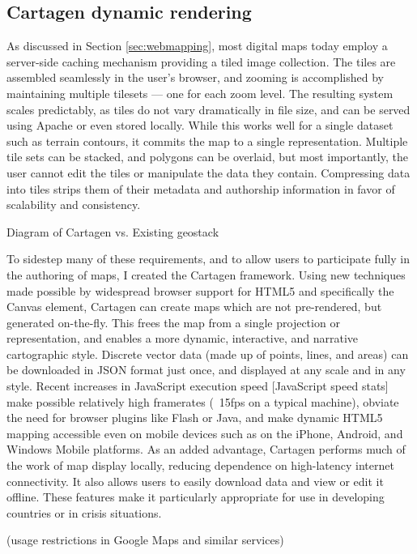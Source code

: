 \documentclass[11pt]{report}
\begin{document}
\subsection{Cartagen dynamic rendering}

As discussed in Section \ref{sec:webmapping}, most digital maps today employ a server-side caching mechanism providing a tiled image collection. The tiles are assembled seamlessly in the user's browser, and zooming is accomplished by maintaining multiple tilesets --- one for each zoom level. The resulting system scales predictably, as tiles do not vary dramatically in file size, and can be served using Apache or even stored locally. While this works well for a single dataset such as terrain contours, it commits the map to a single representation. Multiple tile sets can be stacked, and polygons can be overlaid, but most importantly, the user cannot edit the tiles or manipulate the data they contain. Compressing data into tiles strips them of their metadata and authorship information in favor of scalability and consistency. 

Diagram of Cartagen vs. Existing geostack

To sidestep many of these requirements, and to allow users to participate fully in the authoring of maps, I created the Cartagen framework. Using new techniques made possible by widespread browser support for HTML5 and specifically the Canvas element, Cartagen can create maps which are not pre-rendered, but generated on-the-fly. This frees the map from a single projection or representation, and enables a more dynamic, interactive, and narrative cartographic style. Discrete vector data (made up of points, lines, and areas) can be downloaded in JSON format just once, and displayed at any scale and in any style. Recent increases in JavaScript execution speed [JavaScript speed stats] make possible relatively high framerates (~15fps on a typical machine), obviate the need for browser plugins like Flash or Java, and make dynamic HTML5 mapping accessible even on mobile devices such as on the iPhone, Android, and Windows Mobile platforms. As an added advantage, Cartagen performs much of the work of map display locally, reducing dependence on high-latency internet connectivity. It also allows users to easily download data and view or edit it offline. These features make it particularly appropriate for use in developing countries or in crisis situations. 

(usage restrictions in Google Maps and similar services)
\end{document}
